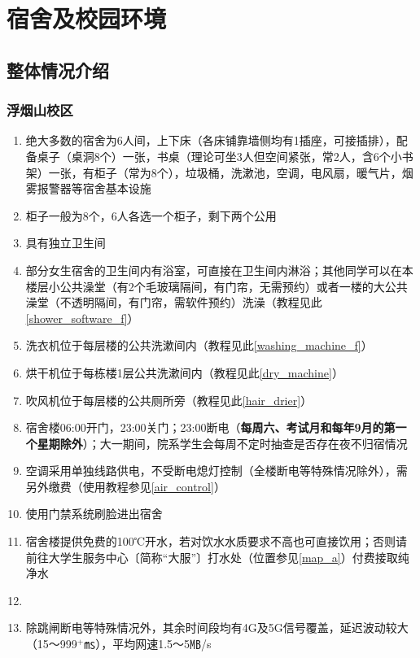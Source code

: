 \chapter[宿舍及校园环境]{宿舍及校园环境}

\section[整体情况介绍]{整体情况介绍}
\subsection[浮烟山校区]{浮烟山校区}
\begin{enumerate}
      \item 绝大多数的宿舍为6人间，上下床（各床铺靠墙侧均有1插座，可接插排），配备桌子（桌洞8个）一张，书桌（理论可坐3人但空间紧张，常2人，含6个小书架）一张，有柜子（常为8个），垃圾桶，洗漱池，空调，电风扇，暖气片，烟雾报警器等宿舍基本设施
      \item 柜子\footnotemark 一般为8个，6人各选一个柜子，剩下两个公用
      \item 具有独立卫生间
      \item 部分女生宿舍的卫生间内有浴室，可直接在卫生间内淋浴；其他同学可以在本楼层小公共澡堂（有2个毛玻璃隔间，有门帘，无需预约）或者一楼的大公共澡堂（不透明隔间，有门帘，需软件预约）洗澡（教程见此\uline{\ref{shower_software_f}}）
      \item 洗衣机位于每层楼的公共洗漱间内（教程见此\uline{\ref{washing_machine_f}}）
      \item 烘干机位于每栋楼1层公共洗漱间内（教程见此\uline{\ref{dry_machine}}）
      \item 吹风机位于每层楼的公共厕所旁（教程见此\uline{\ref{hair_drier}}）
      \item 宿舍楼06:00开门，23:00关门；23:00断电（\textbf{每周六、考试月和每年9月的第一个星期除外}）；大一期间，院系学生会每周不定时抽查是否存在夜不归宿情况
      \item 空调采用单独线路供电，不受断电熄灯控制（全楼断电等特殊情况除外），需另外缴费（使用教程参见\uline{\ref{air_control}}）
      \item 使用门禁系统刷脸进出宿舍
      \item 宿舍楼提供免费的100℃开水\footnotemark，若对饮水水质要求不高也可直接饮用；否则请前往大学生服务中心〔简称“大服”〕打水处（位置参见\uline{\ref{map_a}}）付费接取纯净水
      \item \textbf{}
      \item 除跳闸断电等特殊情况外，其余时间段均有4G及5G信号覆盖，延迟波动较大（15～999$^+$㎳），平均网速1.5～5㎆/s
\end{enumerate}

